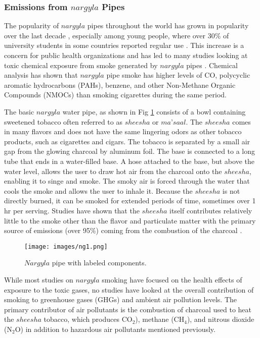 \subsubsection{Emissions from $nargyla$ Pipes}
The popularity of $nargyla$ pipes throughout the world has grown in popularity over the last decade \citep{Chaouachi2009, Monzer2008}, especially among young people, where over 30\% of university students in some countries reported regular use \citep{Eissenberg2009}. This increase is a concern for public health organizations and has led to many studies looking at toxic chemical exposure from smoke generated by $nargyla$ pipes \citep{Daher2010, Eissenberg2009, Monzer2008, Sepetdjian2010, Shihadeh2005}.  Chemical analysis has shown that $nargyla$ pipe smoke has higher levels of CO, polycyclic aromatic hydrocarbons (PAHs), benzene, and other Non-Methane Organic Compounds (NMOCs) than smoking cigarettes during the same period.

The basic $nargyla$ water pipe, as shown in Fig \ref{figng1:pipe} consists of a bowl containing sweetened tobacco often referred to as $sheesha$ or $ma’saal$.  The $sheesha$ comes in many flavors and does not have the same lingering odors as other tobacco products, such as cigarettes and cigars.  The tobacco is separated by a small air gap from the glowing charcoal by aluminum foil.  The base is connected to a long tube that ends in a water-filled base.  A hose attached to the base, but above the water level, allows the user to draw hot air from the charcoal onto the $sheesha$, enabling it to singe and smoke.  The smoky air is forced through the water that cools the smoke and allows the user to inhale it.  Because the $sheesha$ is not directly burned, it can be smoked for extended periods of time, sometimes over 1 hr per serving.  Studies have shown that the $sheesha$ itself contributes relatively little to the smoke other than the flavor and particulate matter with the primary source of emissions (over 95\%) coming from the combustion of the charcoal \citep{Sepetdjian2010}.

%
\begin{figure}[H]
\texttt{[image: images/ng1.png]} 
\caption{$Nargyla$ pipe with labeled components.}
\label{figng1:pipe}
\end{figure}
%
While most studies on $nargyla$ smoking have focused on the health effects of exposure to the toxic gases, no studies have looked at the overall contribution of smoking to greenhouse gases (GHGs) and ambient air pollution levels.  The primary contributor of air pollutants is the combustion of charcoal used to heat the $sheesha$ tobacco, which produces CO$_{2}$), methane (CH$_{4}$), and nitrous dioxide (N$_{2}$O) in addition to hazardous air pollutants mentioned previously.  

